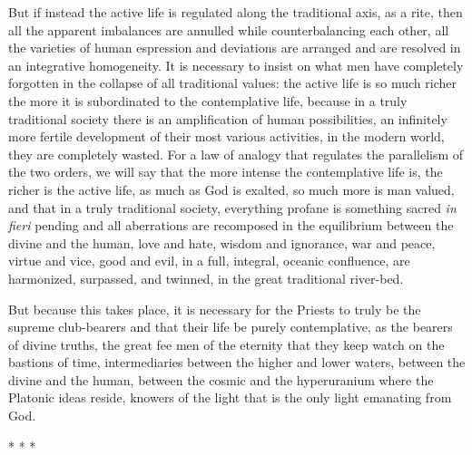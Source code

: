 But if instead the active life is regulated along the traditional axis, as a rite, then all the apparent imbalances are annulled while counterbalancing each other, all the varieties of human espression and deviations are arranged and are resolved in an integrative homogeneity. It is necessary to insist on what men have completely forgotten in the collapse of all traditional values: the active life is so much richer the more it is subordinated to the contemplative life, because in a truly traditional society there is an amplification of human possibilities, an infinitely more fertile development of their most various activities, in the modern world, they are completely wasted. For a law of analogy that regulates the parallelism of the two orders, we will say that the more intense the contemplative life is, the richer is the active life, as much as God is exalted, so much more is man valued, and that in a truly traditional society, everything profane is something sacred \emph{in fieri} pending and all aberrations are recomposed in the equilibrium between the divine and the human, love and hate, wisdom and ignorance, war and peace, virtue and vice, good and evil, in a full, integral, oceanic confluence, are harmonized, surpassed, and twinned, in the great traditional river-bed.

But because this takes place, it is necessary for the Priests to truly be the supreme club-bearers and that their life be purely contemplative, as the bearers of divine truths, the great fee men of the eternity that they keep watch on the bastions of time, intermediaries between the higher and lower waters, between the divine and the human, between the cosmic and the hyperuranium where the Platonic ideas reside, knowers of the light that is the only light emanating from God.


\begin{center}* * *\end{center}


